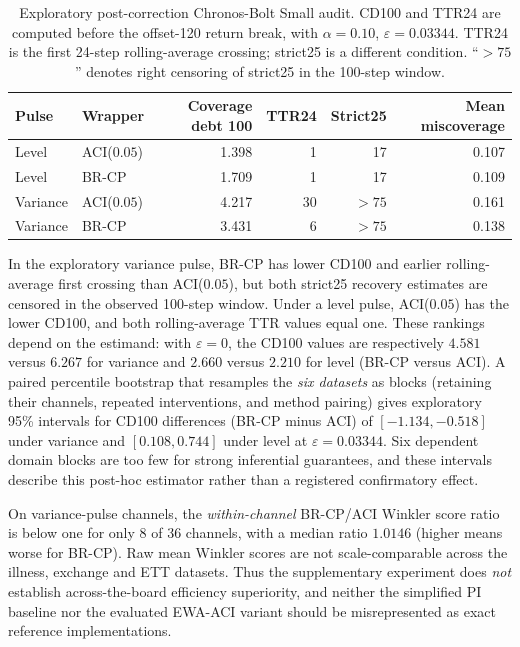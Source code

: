 \documentclass[10pt]{article}
\newcommand{\brcp}{\textsc{BR-CP}}
\begin{document}
\begin{table}[ht]
\centering
\small
\caption{Exploratory post-correction Chronos-Bolt Small audit.
CD100 and TTR24 are computed before the offset-120 return break,
with $\alpha=0.10$, $\varepsilon=0.03344$. TTR24 is the first
24-step rolling-average crossing; strict25 is a different condition.
``$>75$'' denotes right censoring of strict25 in the 100-step window.}
\label{tab:chronos_posthoc}
\begin{tabular}{llrrrr}
\toprule
Pulse & Wrapper & Coverage debt 100 & TTR24 & Strict25 & Mean miscoverage \\
\midrule
Level & ACI($0.05$) & 1.398 & 1 & 17 & 0.107 \\
Level & \brcp{} & 1.709 & 1 & 17 & 0.109 \\
Variance & ACI($0.05$) & 4.217 & 30 & $>75$ & 0.161 \\
Variance & \brcp{} & 3.431 & 6 & $>75$ & 0.138 \\
\bottomrule
\end{tabular}
\end{table}

In the exploratory variance pulse, \brcp{} has lower CD100 and earlier
rolling-average first crossing than ACI($0.05$), but both strict25
recovery estimates are censored in the observed 100-step window.
Under a level pulse, ACI($0.05$) has the lower CD100, and both
rolling-average TTR values equal one. These rankings depend on the
estimand: with $\varepsilon=0$, the CD100 values are respectively
$4.581$ versus $6.267$ for variance and $2.660$ versus $2.210$ for
level (\brcp{} versus ACI). A paired percentile bootstrap that
resamples the \emph{six datasets} as blocks (retaining their channels,
repeated interventions, and method pairing) gives exploratory
95\% intervals for CD100 differences (\brcp{} minus ACI) of
$[-1.134,-0.518]$ under variance and $[0.108,0.744]$ under level
at $\varepsilon=0.03344$. Six dependent domain blocks are too few
for strong inferential guarantees, and these intervals describe this
post-hoc estimator rather than a registered confirmatory effect.

On variance-pulse channels, the \emph{within-channel} BR-CP/ACI
Winkler score ratio is below one for only 8 of 36 channels,
with a median ratio $1.0146$ (higher means worse for BR-CP).
Raw mean Winkler scores are not scale-comparable across the illness,
exchange and ETT datasets. Thus the supplementary experiment does
\emph{not} establish across-the-board efficiency superiority, and
neither the simplified PI baseline nor the evaluated EWA-ACI variant
should be misrepresented as exact reference implementations.
\end{document}
